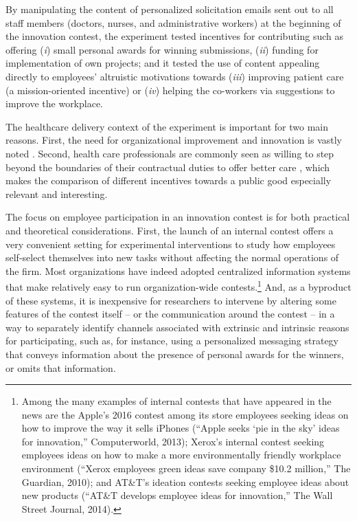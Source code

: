 \documentclass[11pt]{article}
\begin{document}
By manipulating the content of personalized solicitation emails sent out
to all staff members (doctors, nurses, and administrative workers) at
the beginning of the innovation contest, the experiment tested
incentives for contributing such as offering (\emph{i}) small personal
awards for winning submissions, (\emph{ii}) funding for implementation
of own projects; and it tested the use of content appealing directly to
employees' altruistic motivations towards (\emph{iii}) improving patient
care (a mission-oriented incentive) or (\emph{iv}) helping the
co-workers via suggestions to improve the workplace.

The healthcare delivery context of the experiment is important for two
main reasons. First, the need for organizational improvement and
innovation is vastly noted \citep{cutler2012reducing}. Second, health
care professionals are commonly seen as willing to step beyond the
boundaries of their contractual duties to offer better care
\citep{delfgaauw2005dedicated}, which makes the comparison of different
incentives towards a public good especially relevant and interesting.

The focus on employee participation in an innovation contest is for both
practical and theoretical considerations. First, the launch of an
internal contest offers a very convenient setting for experimental
interventions to study how employees self-select themselves into new
tasks without affecting the normal operations of the firm. Most
organizations have indeed adopted centralized information systems that
make relatively easy to run organization-wide contests.\footnote{Among
  the many examples of internal contests that have appeared in the news
  are the Apple's 2016 contest among its store employees seeking ideas
  on how to improve the way it sells iPhones (``Apple seeks `pie in the
  sky' ideas for innovation,'' Computerworld, 2013); Xerox's internal
  contest seeking employees ideas on how to make a more environmentally
  friendly workplace environment (``Xerox employees green ideas save
  company \$10.2 million,'' The Guardian, 2010); and AT\&T's ideation
  contests seeking employee ideas about new products (``AT\&T develops
  employee ideas for innovation,'' The Wall Street Journal, 2014).} And,
as a byproduct of these systems, it is inexpensive for researchers to
intervene by altering some features of the contest itself -- or the
communication around the contest -- in a way to separately identify
channels associated with extrinsic and intrinsic reasons for
participating, such as, for instance, using a personalized messaging
strategy that conveys information about the presence of personal awards
for the winners, or omits that information.
\end{document}
